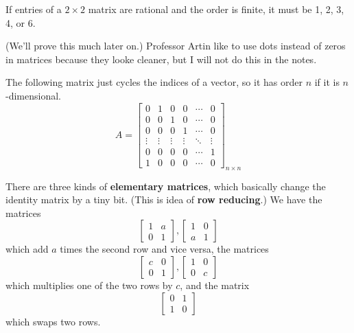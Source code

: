 \documentclass[11pt]{article}
\begin{document}
\begin{theorem}
    If entries of a $2 \times 2$ matrix are rational and the order is finite, it must be 1, 2, 3, 4, or 6.
\end{theorem}

(We'll prove this much later on.) Professor Artin like to use dots instead of zeros in matrices because they looke cleaner, but I will not do this in the notes.

\begin{example}
    The following matrix just cycles the indices of a vector, so it has order $n$ if it is $n$-dimensional.
    \[
        A = \begin{bmatrix}
            0      & 1      & 0      & 0      & \cdots & 0      \\
            0      & 0      & 1      & 0      & \cdots & 0      \\
            0      & 0      & 0      & 1      & \cdots & 0      \\
            \vdots & \vdots & \vdots & \vdots & \ddots & \vdots \\
            0      & 0      & 0      & 0      & \cdots & 1      \\
            1      & 0      & 0      & 0      & \cdots & 0
        \end{bmatrix}_{n \times n}
    \]
\end{example}

There are three kinds of \textbf{elementary matrices}, which basically change
the identity matrix by a tiny bit. (This is idea of \textbf{row reducing}.) We
have the matrices
\[
    \begin{bmatrix}
        1 & a \\
        0 & 1
    \end{bmatrix},
    \begin{bmatrix}
        1 & 0 \\
        a & 1
    \end{bmatrix}
\]
which add $a$ times the second row and vice versa, the matrices
\[
    \begin{bmatrix}
        c & 0 \\
        0 & 1
    \end{bmatrix},
    \begin{bmatrix}
        1 & 0 \\
        0 & c
    \end{bmatrix}
\]
which multiplies one of the two rows by $c$, and the matrix
\[
    \begin{bmatrix}
        0 & 1 \\
        1 & 0
    \end{bmatrix}
\]
which swaps two rows.
\end{document}
